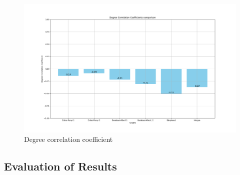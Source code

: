 \begin{figure}
    \centering
    \includegraphics[width=0.9\linewidth]{images/FINAL-TOPO-COMP/Degree-correlation-coeff/deg-coeff-27.png}
    \caption{Degree correlation coefficient}
    \label{fig:enter-label}
\end{figure}

\subsection{Evaluation of Results}
